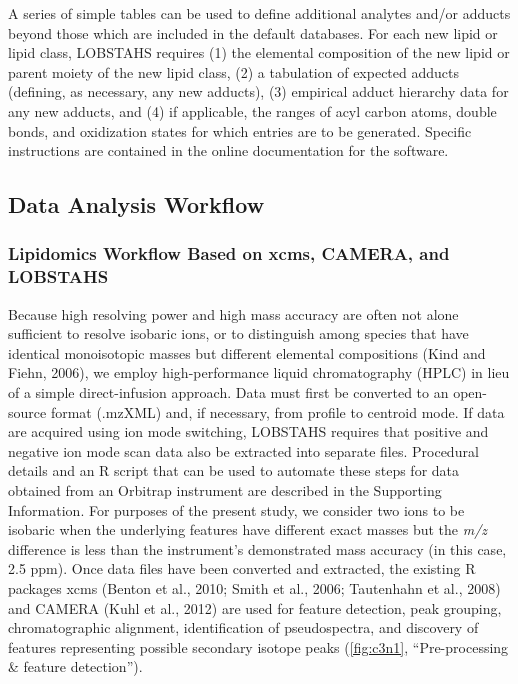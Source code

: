 A series of simple tables can be used to define additional analytes and/or adducts beyond those which are included in the default databases. For each new lipid or lipid class, LOBSTAHS requires (1) the elemental composition of the new lipid or parent moiety of the new lipid class, (2) a tabulation of expected adducts (defining, as necessary, any new adducts), (3) empirical adduct hierarchy data for any new adducts, and (4) if applicable, the ranges of acyl carbon atoms, double bonds, and oxidization states for which entries are to be generated. Specific instructions are contained in the online documentation for the software.

\subsection{Data Analysis Workflow}

\subsubsection{Lipidomics Workflow Based on xcms, CAMERA, and LOBSTAHS}

Because high resolving power and high mass accuracy are often not alone sufficient to resolve isobaric ions, or to distinguish among species that have identical monoisotopic masses but different elemental compositions (Kind and Fiehn, 2006), we employ high-performance liquid chromatography (HPLC) in lieu of a simple direct-infusion approach. Data must first be converted to an open-source format (.mzXML) and, if necessary, from profile to centroid mode. If data are acquired using ion mode switching, LOBSTAHS requires that positive and negative ion mode scan data also be extracted into separate files. Procedural details and an R script that can be used to automate these steps for data obtained from an Orbitrap instrument are described in the Supporting Information. For purposes of the present study, we consider two ions to be isobaric when the underlying features have different exact masses but the \emph{m/z} difference is less than the instrument's demonstrated mass accuracy (in this case, 2.5 ppm). Once data files have been converted and extracted, the existing R packages xcms (Benton et al., 2010; Smith et al., 2006; Tautenhahn et al., 2008) and CAMERA (Kuhl et al., 2012) are used for feature detection, peak grouping, chromatographic alignment, identification of pseudospectra, and discovery of features representing possible secondary isotope peaks (\autoref{fig:c3n1}, ``Pre-processing \& feature detection'').

